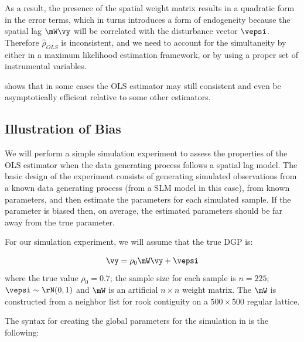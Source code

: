\documentclass[english,12pt]{book}\usepackage[]{graphicx}\usepackage[]{xcolor}
\begin{document}
As a result, the presence of the spatial weight matrix results in a quadratic form in the error terms, which in turns introduces a form of endogeneity because the spatial lag $\mW\vy$ will be correlated with the disturbance vector $\vepsi$. Therefore $\widehat{\rho}_{OLS}$ is inconsistent, and we need to account for the simultaneity by either in a maximum likelihood estimation framework, or by using a proper set of instrumental variables.

\begin{remark}
  \cite{lee2002consistency} shows that in some cases the OLS estimator may still consistent and even be asymptotically efficient relative to some other estimators.
\end{remark}


\subsection{Illustration of Bias}

We will perform a simple simulation experiment to assess the properties of the OLS estimator when the data generating process follows a spatial lag model. The basic design of the experiment consists of generating simulated observations from a known data generating process (from a SLM model in this case), from known parameters, and then estimate the parameters for each simulated sample. If the parameter is biased then, on average, the estimated parameters should be far away from the true parameter.

For our simulation experiment, we will assume that the true DGP is:

\begin{equation}
  \vy = \rho_0\mW\vy + \vepsi
\end{equation}
%
where the true value $\rho_0 = 0.7$; the sample size for each sample is $n = 225$; $\vepsi\sim \rN(0, 1)$ and $\mW$ is an artificial $n\times n$ weight matrix. The $\mW$ is constructed from a neighbor list for rook contiguity on a $500 \times 500$ regular lattice. 

The syntax for creating the global parameters for the simulation in  is the following: 
\end{document}

